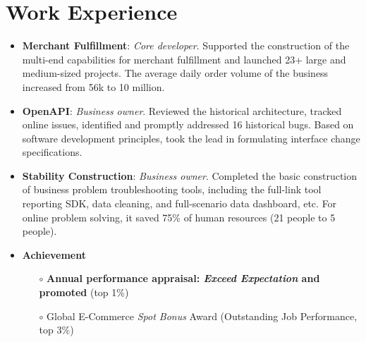 \documentclass{resume}
\begin{document}
\section{Work Experience}
\begin{itemize}[parsep=0.2ex]
    \item \textbf{Merchant Fulfillment}: \textit{Core developer}. Supported the construction of the multi-end capabilities for 
    merchant fulfillment and launched 23+ large and medium-sized projects. The average daily order volume of the business 
    increased from 56k to 10 million.
    \item \textbf{OpenAPI}: \textit{Business owner}. Reviewed the historical architecture, tracked online issues, identified 
    and promptly addressed 16 historical bugs. Based on software development principles, took the lead in formulating interface 
    change specifications.
    \item \textbf{Stability Construction}: \textit{Business owner}. Completed the basic construction of business problem 
    troubleshooting tools, including the full-link tool reporting SDK, data cleaning, and full-scenario data dashboard, etc. 
    For online problem solving, it saved 75\% of human resources (21 people to 5 people).
    \item \textbf{Achievement}
      \begin{itemize}
          \item[$\circ$] \textbf{Annual performance appraisal: \textit{Exceed Expectation} and promoted} (top 1\%)
          \item[$\circ$] Global E-Commerce \textit{Spot Bonus} Award (Outstanding Job Performance, top 3\%)
      \end{itemize}
\end{itemize}
\end{document}
